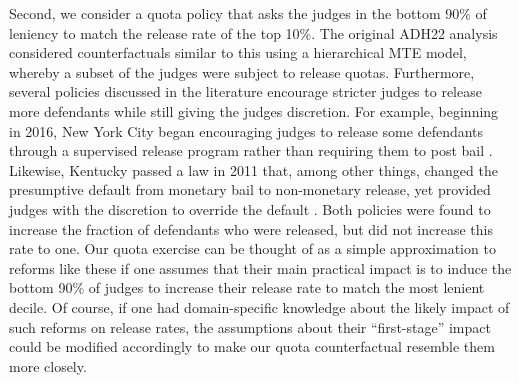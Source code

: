 \documentclass[12pt]{article}%
\theoremstyle{definition}
\newcommand\1{\operatorname{I}\indicatorfence}
\begin{document}
Second, we consider a quota policy that asks the judges in the bottom 90\% of
leniency to match the release rate of the top 10\%. The original ADH22 analysis
considered counterfactuals similar to this using a hierarchical MTE model,
whereby a subset of the judges were subject to release quotas. Furthermore,
several policies discussed in the literature encourage stricter judges to
release more defendants while still giving the  judges discretion. For example, beginning in 2016, New York City began
encouraging judges to release some defendants through a supervised release
program rather than requiring them to post bail
\parencite{skemer_pursuing_2020}. Likewise, Kentucky passed a law in 2011 that,
among other things, changed the presumptive default from monetary bail to
non-monetary release, yet provided judges with the discretion to override the
default \parencite{stevenson_assessing_2018}. Both policies were found to
increase the fraction of defendants who were released, but did not increase this
rate to one. Our quota exercise can be thought of as a simple approximation to
reforms like these if one assumes that their main practical impact is to induce
the bottom 90\% of judges to increase their release rate to match the most lenient decile. Of course, if
one had domain-specific knowledge about the likely impact of such reforms on
release rates, the assumptions about their ``first-stage'' impact could be
modified accordingly to make our quota counterfactual resemble them more
closely.
\end{document}
